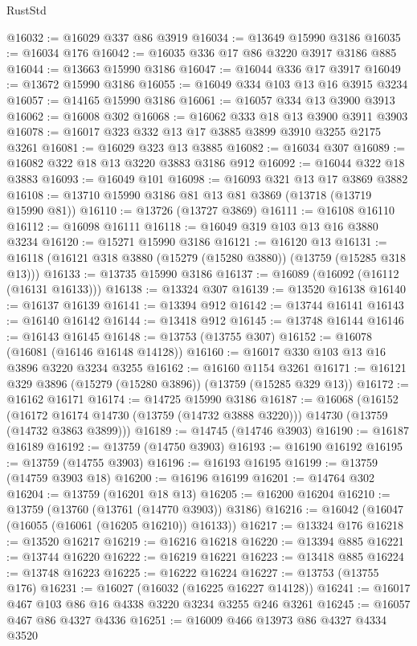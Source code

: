 \begin{lexlean}{RustStd}
\begin{coremodule}
@16032 := @16029 @337 @86 @3919
@16034 := @13649 @15990 @3186
@16035 := @16034 @176
@16042 := @16035 @336 @17 @86 @3220 @3917 @3186 @885
@16044 := @13663 @15990 @3186
@16047 := @16044 @336 @17 @3917
@16049 := @13672 @15990 @3186
@16055 := @16049 @334 @103 @13 @16 @3915 @3234
@16057 := @14165 @15990 @3186
@16061 := @16057 @334 @13 @3900 @3913
@16062 := @16008 @302
@16068 := @16062 @333 @18 @13 @3900 @3911 @3903
@16078 := @16017 @323 @332 @13 @17 @3885 @3899 @3910 @3255 @2175 @3261
@16081 := @16029 @323 @13 @3885
@16082 := @16034 @307
@16089 := @16082 @322 @18 @13 @3220 @3883 @3186 @912
@16092 := @16044 @322 @18 @3883
@16093 := @16049 @101
@16098 := @16093 @321 @13 @17 @3869 @3882
@16108 := @13710 @15990 @3186 @81 @13 @81 @3869 (@13718 (@13719 @15990 @81))
@16110 := @13726 (@13727 @3869)
@16111 := @16108 @16110
@16112 := @16098 @16111
@16118 := @16049 @319 @103 @13 @16 @3880 @3234
@16120 := @15271 @15990 @3186
@16121 := @16120 @13
@16131 := @16118 (@16121 @318 @3880 (@15279 (@15280 @3880)) (@13759 (@15285 @318 @13)))
@16133 := @13735 @15990 @3186
@16137 := @16089 (@16092 (@16112 (@16131 @16133)))
@16138 := @13324 @307
@16139 := @13520 @16138
@16140 := @16137 @16139
@16141 := @13394 @912
@16142 := @13744 @16141
@16143 := @16140 @16142
@16144 := @13418 @912
@16145 := @13748 @16144
@16146 := @16143 @16145
@16148 := @13753 (@13755 @307)
@16152 := @16078 (@16081 (@16146 @16148 @14128))
@16160 := @16017 @330 @103 @13 @16 @3896 @3220 @3234 @3255
@16162 := @16160 @1154 @3261
@16171 := @16121 @329 @3896 (@15279 (@15280 @3896)) (@13759 (@15285 @329 @13))
@16172 := @16162 @16171
@16174 := @14725 @15990 @3186
@16187 := @16068
    (@16152
      (@16172 @16174 @14730 (@13759 (@14732 @3888 @3220)))
      @14730
      (@13759 (@14732 @3863 @3899)))
@16189 := @14745 (@14746 @3903)
@16190 := @16187 @16189
@16192 := @13759 (@14750 @3903)
@16193 := @16190 @16192
@16195 := @13759 (@14755 @3903)
@16196 := @16193 @16195
@16199 := @13759 (@14759 @3903 @18)
@16200 := @16196 @16199
@16201 := @14764 @302
@16204 := @13759 (@16201 @18 @13)
@16205 := @16200 @16204
@16210 := @13759 (@13760 (@13761 (@14770 @3903)) @3186)
@16216 := @16042 (@16047 (@16055 (@16061 (@16205 @16210)) @16133))
@16217 := @13324 @176
@16218 := @13520 @16217
@16219 := @16216 @16218
@16220 := @13394 @885
@16221 := @13744 @16220
@16222 := @16219 @16221
@16223 := @13418 @885
@16224 := @13748 @16223
@16225 := @16222 @16224
@16227 := @13753 (@13755 @176)
@16231 := @16027 (@16032 (@16225 @16227 @14128))
@16241 := @16017 @467 @103 @86 @16 @4338 @3220 @3234 @3255 @246 @3261
@16245 := @16057 @467 @86 @4327 @4336
@16251 := @16009 @466 @13973 @86 @4327 @4334 @3520

\end{coremodule}
\end{lexlean}
